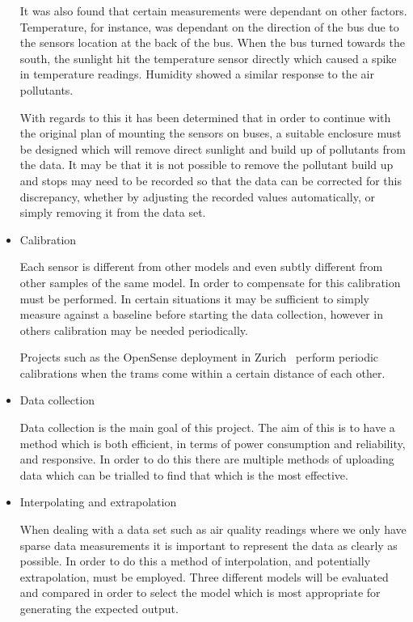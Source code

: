 \begin{itemize}

	It was also found that certain measurements were dependant on other factors. Temperature, for instance, was dependant on the direction of the bus due to the sensors location at the back of the bus. When the bus turned towards the south, the sunlight hit the temperature sensor directly which caused a spike in temperature readings. Humidity showed a similar response to the air pollutants. 

	With regards to this it has been determined that in order to continue with the original plan of mounting the sensors on buses, a suitable enclosure must be designed which will remove direct sunlight and build up of pollutants from the data. It may be that it is not possible to remove the pollutant build up and stops may need to be recorded so that the data can be corrected for this discrepancy, whether by adjusting the recorded values automatically, or simply removing it from the data set. 

	\item Calibration

	Each sensor is different from other models and even subtly different from other samples of the same model. In order to compensate for this calibration must be performed. In certain situations it may be sufficient to simply measure against a baseline before starting the data collection, however in others calibration may be needed periodically. 

	Projects such as the OpenSense deployment in Zurich~\cite{opensensezurich} perform periodic calibrations when the trams come within a certain distance of each other. 


	\item Data collection
	
	Data collection is the main goal of this project. The aim of this is to have a method which is both efficient, in terms of power consumption and reliability, and responsive. In order to do this there are multiple methods of uploading data which can be trialled to find that which is the most effective.

	\item Interpolating and extrapolation

	When dealing with a data set such as air quality readings where we only have sparse data measurements it is important to represent the data as clearly as possible. In order to do this a method of interpolation, and potentially extrapolation, must be employed. Three  different models will be evaluated and compared in order to select the model which is most appropriate for generating the expected output.

\end{itemize}

